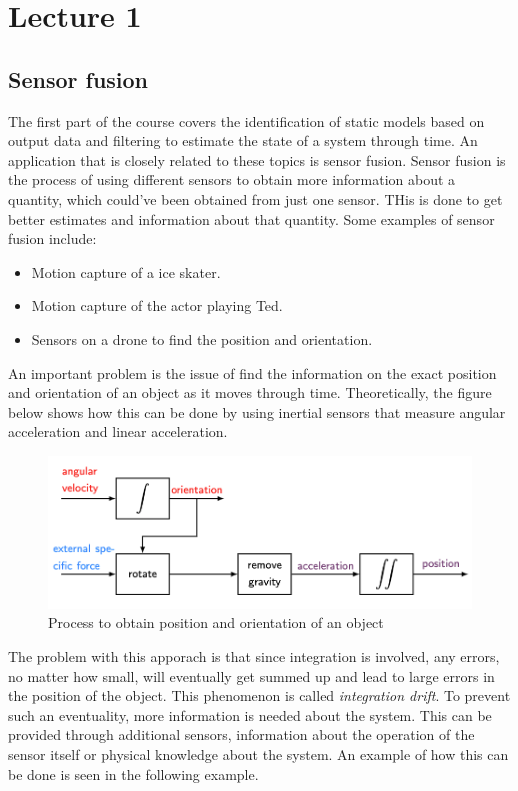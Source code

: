 \section{Lecture 1}
\subsection{Sensor fusion}
The first part of the course covers the identification of static models based on output data and filtering to estimate the state of a system through time. An application that is closely related to these topics is sensor fusion. Sensor fusion is the process of using different sensors to obtain more information about a quantity, which could've been obtained from just one sensor. THis is done to get better estimates and information about that quantity. Some examples of sensor fusion include: 
\begin{itemize}
	\item Motion capture of a ice skater.
	\item Motion capture of the actor playing Ted.
	\item Sensors on a drone to find the position and orientation. 
\end{itemize} 
An important problem is the issue of find the information on the exact position and orientation of an object as it moves through time. Theoretically, the figure below shows how this can be done by using inertial sensors that measure angular acceleration and linear acceleration. 
\begin{figure}[H]
	\centering 
	\includegraphics[scale = 0.4]{Lecture 1/images/inertial sensors}
	\caption{Process to obtain position and orientation of an object}
	\label{inertial sensors}
\end{figure}
The problem with this apporach is that since integration is involved, any errors, no matter how small, will eventually get summed up and lead to large errors in the position of the object. This phenomenon is called \emph{integration drift}. To prevent such an eventuality, more information is needed about the system. This can be provided through additional sensors, information about the operation of the sensor itself or physical knowledge about the system. An example of how this can be done is seen in the following example. 
